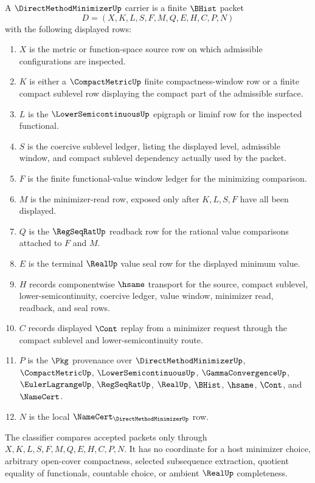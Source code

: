 \begin{definition}
\label{def:direct-method-minimizer-carrier}
A $\DirectMethodMinimizerUp$ carrier is a finite $\BHist$ packet
$$
D=(X,K,L,S,F,M,Q,E,H,C,P,N)
$$
with the following displayed rows:
\begin{enumerate}
\item $X$ is the metric or function-space source row on which admissible configurations are inspected.
\item $K$ is either a $\CompactMetricUp$ finite compactness-window row or a finite compact sublevel row displaying the compact part of the admissible surface.
\item $L$ is the $\LowerSemicontinuousUp$ epigraph or liminf row for the inspected functional.
\item $S$ is the coercive sublevel ledger, listing the displayed level, admissible window, and compact sublevel dependency actually used by the packet.
\item $F$ is the finite functional-value window ledger for the minimizing comparison.
\item $M$ is the minimizer-read row, exposed only after $K,L,S,F$ have all been displayed.
\item $Q$ is the $\RegSeqRatUp$ readback row for the rational value comparisons attached to $F$ and $M$.
\item $E$ is the terminal $\RealUp$ value seal row for the displayed minimum value.
\item $H$ records componentwise $\hsame$ transport for the source, compact sublevel, lower-semicontinuity, coercive ledger, value window, minimizer read, readback, and seal rows.
\item $C$ records displayed $\Cont$ replay from a minimizer request through the compact sublevel and lower-semicontinuity route.
\item $P$ is the $\Pkg$ provenance over $\DirectMethodMinimizerUp$, $\CompactMetricUp$, $\LowerSemicontinuousUp$, $\GammaConvergenceUp$, $\EulerLagrangeUp$, $\RegSeqRatUp$, $\RealUp$, $\BHist$, $\hsame$, $\Cont$, and $\NameCert$.
\item $N$ is the local $\NameCert_{\DirectMethodMinimizerUp}$ row.
\end{enumerate}
The classifier compares accepted packets only through $X,K,L,S,F,M,Q,E,H,C,P,N$. It has no coordinate for a host minimizer choice, arbitrary open-cover compactness, selected subsequence extraction, quotient equality of functionals, countable choice, or ambient $\RealUp$ completeness.
\end{definition}

